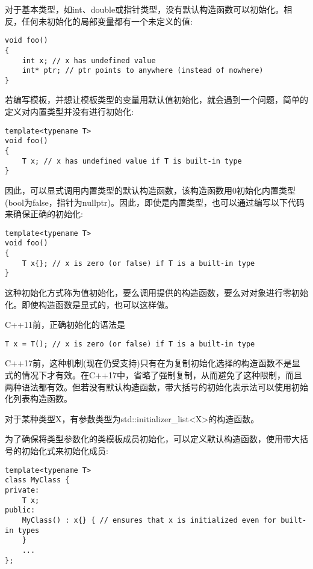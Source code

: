 对于基本类型，如int、double或指针类型，没有默认构造函数可以初始化。相反，任何未初始化的局部变量都有一个未定义的值:

\begin{lstlisting}[style=styleCXX]
void foo()
{
	int x; // x has undefined value
	int* ptr; // ptr points to anywhere (instead of nowhere)
}
\end{lstlisting}

若编写模板，并想让模板类型的变量用默认值初始化，就会遇到一个问题，简单的定义对内置类型并没有进行初始化:

\begin{lstlisting}[style=styleCXX]
template<typename T>
void foo()
{
	T x; // x has undefined value if T is built-in type
}
\end{lstlisting}

因此，可以显式调用内置类型的默认构造函数，该构造函数用0初始化内置类型(bool为false，指针为nullptr)。因此，即使是内置类型，也可以通过编写以下代码来确保正确的初始化:

\begin{lstlisting}[style=styleCXX]
template<typename T>
void foo()
{
	T x{}; // x is zero (or false) if T is a built-in type
}
\end{lstlisting}

这种初始化方式称为值初始化，要么调用提供的构造函数，要么对对象进行零初始化。即使构造函数是显式的，也可以这样做。

C++11前，正确初始化的语法是

\begin{lstlisting}[style=styleCXX]
T x = T(); // x is zero (or false) if T is a built-in type
\end{lstlisting}

C++17前，这种机制(现在仍受支持)只有在为复制初始化选择的构造函数不是显式的情况下才有效。在C++17中，省略了强制复制，从而避免了这种限制，而且两种语法都有效。但若没有默认构造函数，带大括号的初始化表示法可以使用初始化列表构造函数。

\begin{tcolorbox}[colback=webgreen!5!white,colframe=webgreen!75!black]
\hspace*{0.75cm}对于某种类型X，有参数类型为std::initializer\_list<X>的构造函数。
\end{tcolorbox}

为了确保将类型参数化的类模板成员初始化，可以定义默认构造函数，使用带大括号的初始化式来初始化成员:

\begin{lstlisting}[style=styleCXX]
template<typename T>
class MyClass {
private:
	T x;
public:
	MyClass() : x{} { // ensures that x is initialized even for built-in types
	}
	...
};
\end{lstlisting}

